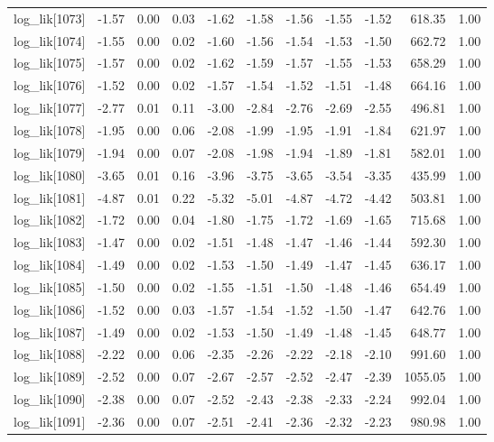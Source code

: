 \begin{table}[ht]
\begin{tabular}{rrrrrrrrrrr}
  log\_lik[1073] & -1.57 & 0.00 & 0.03 & -1.62 & -1.58 & -1.56 & -1.55 & -1.52 & 618.35 & 1.00 \\ 
  log\_lik[1074] & -1.55 & 0.00 & 0.02 & -1.60 & -1.56 & -1.54 & -1.53 & -1.50 & 662.72 & 1.00 \\ 
  log\_lik[1075] & -1.57 & 0.00 & 0.02 & -1.62 & -1.59 & -1.57 & -1.55 & -1.53 & 658.29 & 1.00 \\ 
  log\_lik[1076] & -1.52 & 0.00 & 0.02 & -1.57 & -1.54 & -1.52 & -1.51 & -1.48 & 664.16 & 1.00 \\ 
  log\_lik[1077] & -2.77 & 0.01 & 0.11 & -3.00 & -2.84 & -2.76 & -2.69 & -2.55 & 496.81 & 1.00 \\ 
  log\_lik[1078] & -1.95 & 0.00 & 0.06 & -2.08 & -1.99 & -1.95 & -1.91 & -1.84 & 621.97 & 1.00 \\ 
  log\_lik[1079] & -1.94 & 0.00 & 0.07 & -2.08 & -1.98 & -1.94 & -1.89 & -1.81 & 582.01 & 1.00 \\ 
  log\_lik[1080] & -3.65 & 0.01 & 0.16 & -3.96 & -3.75 & -3.65 & -3.54 & -3.35 & 435.99 & 1.00 \\ 
  log\_lik[1081] & -4.87 & 0.01 & 0.22 & -5.32 & -5.01 & -4.87 & -4.72 & -4.42 & 503.81 & 1.00 \\ 
  log\_lik[1082] & -1.72 & 0.00 & 0.04 & -1.80 & -1.75 & -1.72 & -1.69 & -1.65 & 715.68 & 1.00 \\ 
  log\_lik[1083] & -1.47 & 0.00 & 0.02 & -1.51 & -1.48 & -1.47 & -1.46 & -1.44 & 592.30 & 1.00 \\ 
  log\_lik[1084] & -1.49 & 0.00 & 0.02 & -1.53 & -1.50 & -1.49 & -1.47 & -1.45 & 636.17 & 1.00 \\ 
  log\_lik[1085] & -1.50 & 0.00 & 0.02 & -1.55 & -1.51 & -1.50 & -1.48 & -1.46 & 654.49 & 1.00 \\ 
  log\_lik[1086] & -1.52 & 0.00 & 0.03 & -1.57 & -1.54 & -1.52 & -1.50 & -1.47 & 642.76 & 1.00 \\ 
  log\_lik[1087] & -1.49 & 0.00 & 0.02 & -1.53 & -1.50 & -1.49 & -1.48 & -1.45 & 648.77 & 1.00 \\ 
  log\_lik[1088] & -2.22 & 0.00 & 0.06 & -2.35 & -2.26 & -2.22 & -2.18 & -2.10 & 991.60 & 1.00 \\ 
  log\_lik[1089] & -2.52 & 0.00 & 0.07 & -2.67 & -2.57 & -2.52 & -2.47 & -2.39 & 1055.05 & 1.00 \\ 
  log\_lik[1090] & -2.38 & 0.00 & 0.07 & -2.52 & -2.43 & -2.38 & -2.33 & -2.24 & 992.04 & 1.00 \\ 
  log\_lik[1091] & -2.36 & 0.00 & 0.07 & -2.51 & -2.41 & -2.36 & -2.32 & -2.23 & 980.98 & 1.00 \\ 

\end{tabular}
\end{table}
